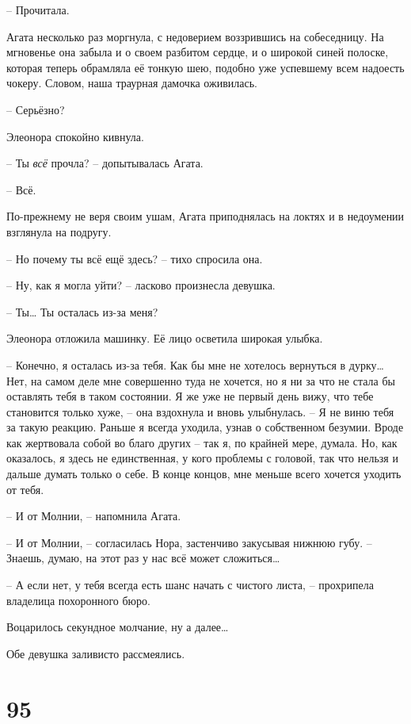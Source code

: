 \documentclass[
  a5paperpaper,
  DIV=11,
  numbers=noendperiod]{scrreprt}
\begin{document}
-- Прочитала.

Агата несколько раз моргнула, с недоверием воззрившись на собеседницу.
На мгновенье она забыла и о своем разбитом сердце, и о широкой синей
полоске, которая теперь обрамляла её тонкую шею, подобно уже успевшему
всем надоесть чокеру. Словом, наша траурная дамочка оживилась.

-- Серьёзно?

Элеонора спокойно кивнула.

-- Ты \emph{всё} прочла? -- допытывалась Агата.

-- Всё.

По-прежнему не веря своим ушам, Агата приподнялась на локтях и в
недоумении взглянула на подругу.

-- Но почему ты всё ещё здесь? -- тихо спросила она.

-- Ну, как я могла уйти? -- ласково произнесла девушка.

-- Ты\ldots{} Ты осталась из-за меня?

Элеонора отложила машинку. Её лицо осветила широкая улыбка.

-- Конечно, я осталась из-за тебя. Как бы мне не хотелось вернуться в
дурку\ldots{} Нет, на самом деле мне совершенно туда не хочется, но я ни
за что не стала бы оставлять тебя в таком состоянии. Я же уже не первый
день вижу, что тебе становится только хуже, -- она вздохнула и вновь
улыбнулась. -- Я не виню тебя за такую реакцию. Раньше я всегда уходила,
узнав о собственном безумии. Вроде как жертвовала собой во благо других
-- так я, по крайней мере, думала. Но, как оказалось, я здесь не
единственная, у кого проблемы с головой, так что нельзя и дальше думать
только о себе. В конце концов, мне меньше всего хочется уходить от тебя.

-- И от Молнии, -- напомнила Агата.

-- И от Молнии, -- согласилась Нора, застенчиво закусывая нижнюю губу.
-- Знаешь, думаю, на этот раз у нас всё может сложиться\ldots{}

-- А если нет, у тебя всегда есть шанс начать с чистого листа, --
прохрипела владелица похоронного бюро.

Воцарилось секундное молчание, ну а далее\ldots{}

Обе девушка заливисто рассмеялись.

\section*{95}\label{95}
\end{document}
